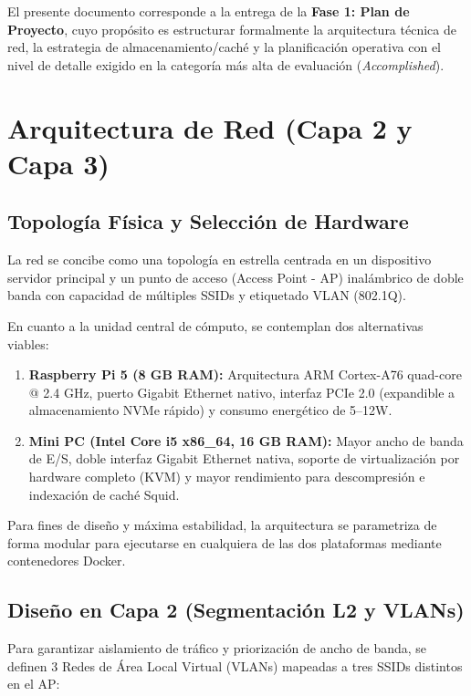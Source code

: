 \documentclass[conference]{IEEEtran}
\begin{document}
El presente documento corresponde a la entrega de la \textbf{Fase 1: Plan de Proyecto}, cuyo propósito es estructurar formalmente la arquitectura técnica de red, la estrategia de almacenamiento/caché y la planificación operativa con el nivel de detalle exigido en la categoría más alta de evaluación (\textit{Accomplished}).

\section{Arquitectura de Red (Capa 2 y Capa 3)}

\subsection{Topología Física y Selección de Hardware}
La red se concibe como una topología en estrella centrada en un dispositivo servidor principal y un punto de acceso (Access Point - AP) inalámbrico de doble banda con capacidad de múltiples SSIDs y etiquetado VLAN (802.1Q). 

En cuanto a la unidad central de cómputo, se contemplan dos alternativas viables:
\begin{enumerate}
    \item \textbf{Raspberry Pi 5 (8 GB RAM):} Arquitectura ARM Cortex-A76 quad-core @ 2.4 GHz, puerto Gigabit Ethernet nativo, interfaz PCIe 2.0 (expandible a almacenamiento NVMe rápido) y consumo energético de 5--12W.
    \item \textbf{Mini PC (Intel Core i5 x86\_64, 16 GB RAM):} Mayor ancho de banda de E/S, doble interfaz Gigabit Ethernet nativa, soporte de virtualización por hardware completo (KVM) y mayor rendimiento para descompresión e indexación de caché Squid.
\end{enumerate}

Para fines de diseño y máxima estabilidad, la arquitectura se parametriza de forma modular para ejecutarse en cualquiera de las dos plataformas mediante contenedores Docker.

\subsection{Diseño en Capa 2 (Segmentación L2 y VLANs)}
Para garantizar aislamiento de tráfico y priorización de ancho de banda, se definen 3 Redes de Área Local Virtual (VLANs) mapeadas a tres SSIDs distintos en el AP:
\end{document}
